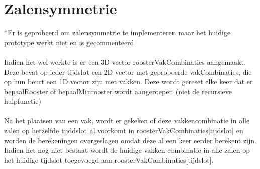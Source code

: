 \documentclass{article}
\begin{document}
\section{Zalensymmetrie}
*Er is geprobeerd om zalensymmetrie te implementeren maar het huidige prototype werkt niet en is gecommenteerd.\\ \\
Indien het wel werkte is er een 3D vector roosterVakCombinaties aangemaakt. Deze bevat op ieder tijdslot een 2D vector met geprobeerde vakCombinaties, die op hun beurt een 1D vector zijn met vakken. Deze wordt gereset elke keer dat er bepaalRooster of bepaalMinrooster wordt aangeroepen (niet de recursieve hulpfunctie)\\ \\
Na het plaatsen van een vak, wordt er gekeken of deze vakkencombinatie in alle zalen op hetzelfde tijddslot al voorkomt in roosterVakCombinaties[tijdslot] en worden de berekeningen overgeslagen omdat deze al een keer eerder berekent zijn. Indien het nog niet bestaat wordt de huidige vakken combinatie in alle zalen op het huidige tijdslot toegevoegd aan roosterVakCombinaties[tijdslot]. 

\newpage
\end{document}

